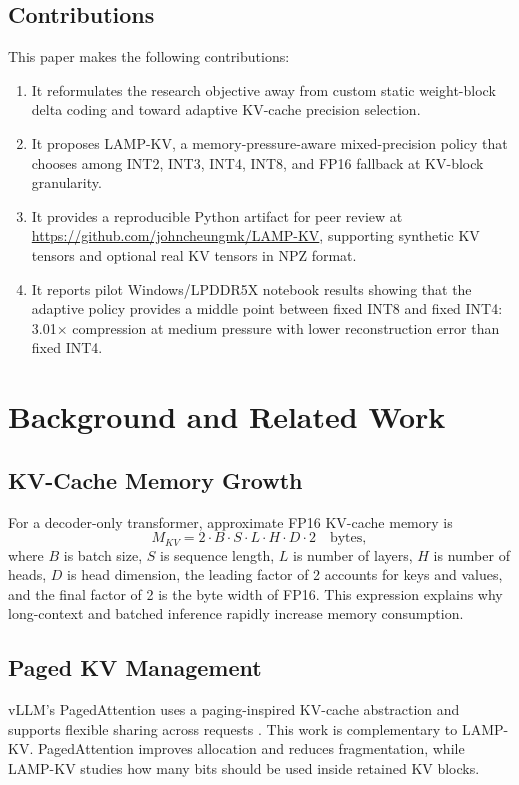\documentclass[11pt]{article}
\begin{document}
\subsection{Contributions}
This paper makes the following contributions:
\begin{enumerate}
    \item It reformulates the research objective away from custom static weight-block delta coding and toward adaptive KV-cache precision selection.
    \item It proposes LAMP-KV, a memory-pressure-aware mixed-precision policy that chooses among INT2, INT3, INT4, INT8, and FP16 fallback at KV-block granularity.
    \item It provides a reproducible Python artifact for peer review at \url{https://github.com/johncheungmk/LAMP-KV}, supporting synthetic KV tensors and optional real KV tensors in NPZ format.
    \item It reports pilot Windows/LPDDR5X notebook results showing that the adaptive policy provides a middle point between fixed INT8 and fixed INT4: 3.01$\times$ compression at medium pressure with lower reconstruction error than fixed INT4.
\end{enumerate}

\section{Background and Related Work}
\subsection{KV-Cache Memory Growth}
For a decoder-only transformer, approximate FP16 KV-cache memory is
\begin{equation}
    M_{KV} = 2 \cdot B \cdot S \cdot L \cdot H \cdot D \cdot 2 \quad \text{bytes},
\end{equation}
where $B$ is batch size, $S$ is sequence length, $L$ is number of layers, $H$ is number of heads, $D$ is head dimension, the leading factor of 2 accounts for keys and values, and the final factor of 2 is the byte width of FP16. This expression explains why long-context and batched inference rapidly increase memory consumption.

\subsection{Paged KV Management}
vLLM's PagedAttention uses a paging-inspired KV-cache abstraction and supports flexible sharing across requests \cite{kwon2023pagedattention}. This work is complementary to LAMP-KV. PagedAttention improves allocation and reduces fragmentation, while LAMP-KV studies how many bits should be used inside retained KV blocks.
\end{document}
